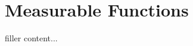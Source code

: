 \documentclass[../../templates/section]{subfiles}
\begin{document}
\section{Measurable Functions}\label{sec:measurable-functions}

filler content...
\end{document}
